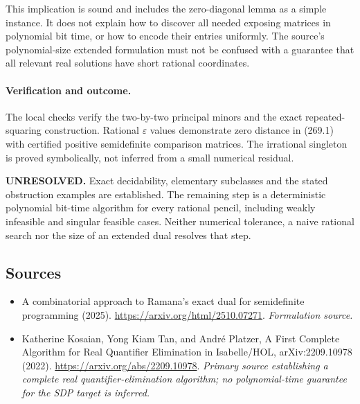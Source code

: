 \documentclass[11pt]{article}
\begin{document}
This implication is sound and includes the zero-diagonal lemma as a simple instance. It does not explain how to discover all needed exposing matrices in polynomial bit time, or how to encode their entries uniformly. The source's polynomial-size extended formulation must not be confused with a guarantee that all relevant real solutions have short rational coordinates.

\paragraph{Verification and outcome.}
The local checks verify the two-by-two principal minors and the exact repeated-squaring construction. Rational $\varepsilon$ values demonstrate zero distance in (269.1) with certified positive semidefinite comparison matrices. The irrational singleton is proved symbolically, not inferred from a small numerical residual.

\textbf{UNRESOLVED.} Exact decidability, elementary subclasses and the stated obstruction examples are established. The remaining step is a deterministic polynomial bit-time algorithm for every rational pencil, including weakly infeasible and singular feasible cases. Neither numerical tolerance, a naive rational search nor the size of an extended dual resolves that step.

\subsection{Sources}
\begin{itemize}
\item[S1]A combinatorial approach to Ramana's exact dual for semidefinite programming (2025).
\url{https://arxiv.org/html/2510.07271}.
\textit{Formulation source.}
\item[E1]Katherine Kosaian, Yong Kiam Tan, and André Platzer, A First Complete Algorithm for Real Quantifier Elimination in Isabelle/HOL, arXiv:2209.10978 (2022).
\url{https://arxiv.org/abs/2209.10978}.
\textit{Primary source establishing a complete real quantifier-elimination algorithm; no polynomial-time guarantee for the SDP target is inferred.}
\end{itemize}
\end{document}
